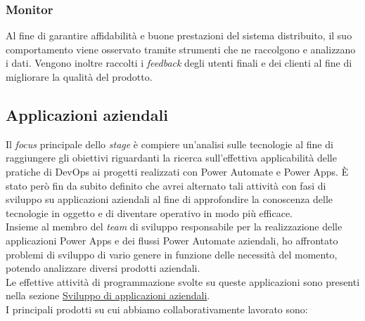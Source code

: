 \subsubsection*{Monitor}
Al fine di garantire affidabilità e buone prestazioni del sistema distribuito, il suo comportamento viene osservato tramite strumenti che ne raccolgono e analizzano i dati. 
Vengono inoltre raccolti i \emph{feedback} degli utenti finali e dei clienti al fine di migliorare la qualità del prodotto. 

\subsection{Applicazioni aziendali}
Il \emph{focus} principale dello \emph{stage} è compiere un'analisi sulle tecnologie al fine di raggiungere gli obiettivi riguardanti la ricerca sull'effettiva applicabilità delle pratiche di \gls{DevOps} ai progetti realizzati con Power Automate e Power Apps.
È stato però fin da subito definito che avrei alternato tali attività con fasi di sviluppo su applicazioni aziendali al fine di approfondire la conoscenza delle tecnologie in oggetto e di diventare operativo in modo più efficace.\\
Insieme al membro del \emph{team} di sviluppo responsabile per la realizzazione delle applicazioni Power Apps e dei flussi Power Automate aziendali, ho affrontato problemi di sviluppo di vario genere in funzione delle necessità del momento, potendo analizzare diversi prodotti aziendali.\\
Le effettive attività di programmazione svolte su queste applicazioni sono presenti nella sezione \hyperref[sviluppoApplicazioni]{Sviluppo di applicazioni aziendali}.\\
I principali prodotti su cui abbiamo collaborativamente lavorato sono:
